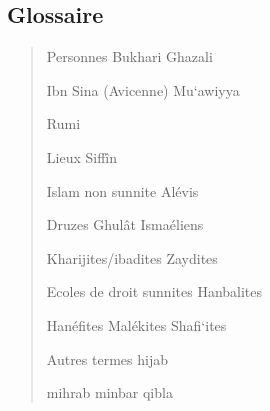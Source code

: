 \hypertarget{glossaire}{%
\subsection{\texorpdfstring{{Glossaire}}{Glossaire}}\label{glossaire}}

\begin{quote}
{Personnes} Bukhari Ghazali

Ibn Sina (Avicenne) Mu`awiyya

Rumi

{Lieux} Siffîn

{Islam non sunnite} Alévis

Druzes Ghulât Ismaéliens

Kharijites/ibadites Zaydites

{Ecoles de droit sunnites} Hanbalites

Hanéfites Malékites Shafi`ites

{Autres termes} hijab

mihrab minbar qibla

 
\end{quote}



